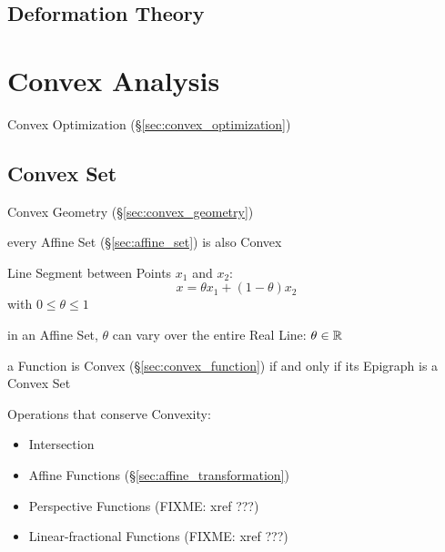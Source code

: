 \subsection{Deformation Theory}\label{sec:deformation_theory}




\section{Convex Analysis}\label{sec:convex_analysis}

\fist Convex Optimization (\S\ref{sec:convex_optimization})



\subsection{Convex Set}\label{sec:convex_set}


\fist Convex Geometry (\S\ref{sec:convex_geometry})

every Affine Set (\S\ref{sec:affine_set}) is also Convex

Line Segment between Points $x_1$ and $x_2$:
\[
  x = \theta x_1 + (1-\theta) x_2
\]
with $0 \leq \theta \leq 1$

\fist in an Affine Set, $\theta$ can vary over the entire Real Line: $\theta
\in \mathbb{R}$

a Function is Convex (\S\ref{sec:convex_function}) if and only if its Epigraph
is a Convex Set

Operations that conserve Convexity:
\begin{itemize}
  \item Intersection
  \item Affine Functions (\S\ref{sec:affine_transformation})
  \item Perspective Functions (FIXME: xref ???)
  \item Linear-fractional Functions (FIXME: xref ???)
\end{itemize}

